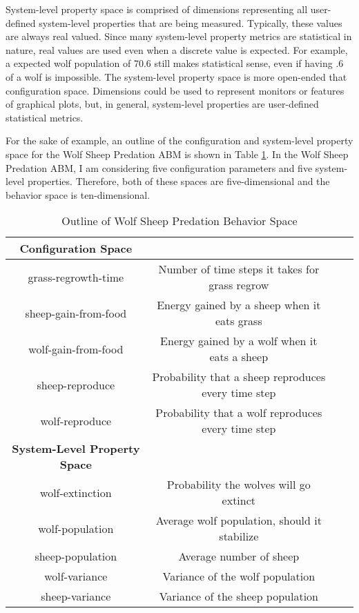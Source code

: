 System-level property space is comprised of dimensions representing all user-defined system-level properties that are being measured.
Typically, these values are always real valued.
Since many system-level property metrics are statistical in nature, real values are used even when a discrete value is expected.
For example, a expected wolf population of 70.6 still makes statistical sense, even if having .6 of a wolf is impossible.
The system-level property space is more open-ended that configuration space.
Dimensions could be used to represent monitors or features of graphical plots, but, in general, system-level properties are user-defined statistical metrics.

For the sake of example, an outline of the configuration and system-level property space for the Wolf Sheep Predation ABM is shown in Table \ref{table:ws_parameters}.
In the Wolf Sheep Predation ABM, I am considering five configuration parameters and five system-level properties.
Therefore, both of these spaces are five-dimensional and the behavior space is ten-dimensional.

\begin{table}[ht]
  \caption{Outline of Wolf Sheep Predation Behavior Space}
  \centering
  \begin{tabular}{c c c c}
    \hline \hline
    \textbf{Configuration Space} \\
    \hline
    grass-regrowth-time & Number of time steps it takes for grass regrow \\
    sheep-gain-from-food & Energy gained by a sheep when it eats grass \\ 
    wolf-gain-from-food & Energy gained by a wolf when it eats a sheep \\
    sheep-reproduce & Probability that a sheep reproduces every time step \\
    wolf-reproduce & Probability that a wolf reproduces every time step\\
    \hline \hline
    \textbf{System-Level Property Space} \\
    \hline
    wolf-extinction & Probability the wolves will go extinct \\
    wolf-population & Average wolf population, should it stabilize \\
    sheep-population & Average number of sheep \\
    wolf-variance & Variance of the wolf population \\
    sheep-variance & Variance of the sheep population \\
    \hline


  \end{tabular}
  \label{table:ws_parameters}
\end{table}



